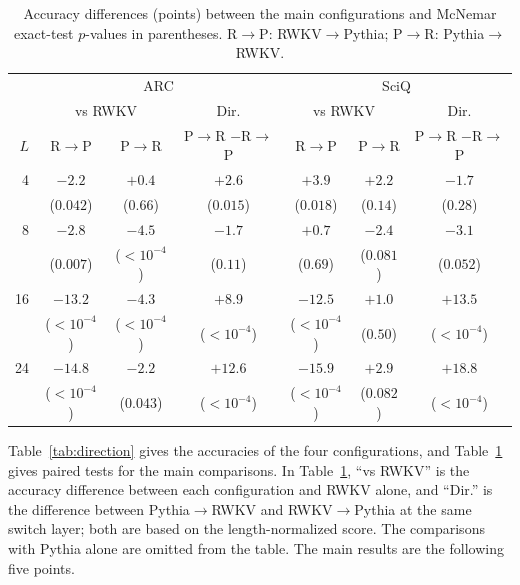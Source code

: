 \documentclass[conference]{IEEEtran}
\newcommand{\tabref}[1]{Table~\ref{#1}}
\newcommand{\RtoP}{RWKV$\to$\allowbreak Pythia}
\newcommand{\PtoR}{Pythia$\to$\allowbreak RWKV}
\begin{document}
\begin{table}[!t]\centering\small
\caption{Accuracy differences (points) between the main configurations and McNemar exact-test $p$-values in parentheses. R$\to$P: RWKV$\to$Pythia; P$\to$R: Pythia$\to$RWKV.}\label{tab:paired}
\setlength{\tabcolsep}{1.6pt}
\begin{tabular}{rcccccc}\toprule
& \multicolumn{3}{c}{ARC} & \multicolumn{3}{c}{SciQ}\\
\cmidrule(lr){2-4}\cmidrule(lr){5-7}
& \multicolumn{2}{c}{vs RWKV} & Dir. & \multicolumn{2}{c}{vs RWKV} & Dir.\\
\cmidrule(lr){2-3}\cmidrule(lr){5-6}
$L$ & R$\to$P & P$\to$R & \shortstack{P$\to$R\\$-$R$\to$P} & R$\to$P & P$\to$R & \shortstack{P$\to$R\\$-$R$\to$P}\\\midrule
4 & $-2.2$ & $+0.4$ & $+2.6$ & $+3.9$ & $+2.2$ & $-1.7$\\
   & ($0.042$) & ($0.66$) & ($0.015$) & ($0.018$) & ($0.14$) & ($0.28$)\\[2pt]
8 & $-2.8$ & $-4.5$ & $-1.7$ & $+0.7$ & $-2.4$ & $-3.1$\\
   & ($0.007$) & ($<10^{-4}$) & ($0.11$) & ($0.69$) & ($0.081$) & ($0.052$)\\[2pt]
16 & $-13.2$ & $-4.3$ & $+8.9$ & $-12.5$ & $+1.0$ & $+13.5$\\
   & ($<10^{-4}$) & ($<10^{-4}$) & ($<10^{-4}$) & ($<10^{-4}$) & ($0.50$) & ($<10^{-4}$)\\[2pt]
24 & $-14.8$ & $-2.2$ & $+12.6$ & $-15.9$ & $+2.9$ & $+18.8$\\
   & ($<10^{-4}$) & ($0.043$) & ($<10^{-4}$) & ($<10^{-4}$) & ($0.082$) & ($<10^{-4}$)\\[2pt]
\bottomrule
\end{tabular}
\end{table}

\tabref{tab:direction} gives the accuracies of the four configurations, and \tabref{tab:paired} gives paired tests for the main
comparisons. In \tabref{tab:paired}, ``vs RWKV'' is the accuracy difference between each configuration and RWKV alone, and ``Dir.'' is
the difference between \PtoR{} and \RtoP{} at the same switch layer; both are based on the length-normalized score. The comparisons with Pythia
alone are omitted from the table. The main results are the following five points.
\end{document}
